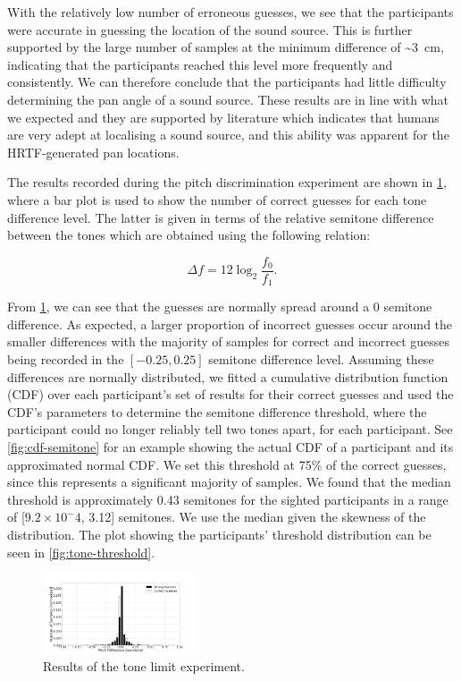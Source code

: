\documentclass[sigconf, review=true, screen=true, anonymous=true]{acmart}
\begin{document}
With the relatively low number of erroneous guesses, we see that the participants were accurate in guessing the location of the sound source.
This is further supported by the large number of samples at the minimum difference of \textasciitilde\SI{3}{\cm}, indicating that the participants reached this level more frequently and consistently.
We can therefore conclude that the participants had little difficulty determining the pan angle of a sound source.
These results are in line with what we expected and they are supported by literature which indicates that humans are very adept at localising a sound source, and this ability was apparent for the HRTF-generated pan locations. 

The results recorded during the pitch discrimination experiment are shown in \cref{fig:tone-guesses}, where a bar plot is used to show the number of correct guesses for each tone difference level.
The latter is given in terms of the relative semitone difference between the tones which are obtained using the following relation: 

\begin{equation}
\label{eq:semitone-difference}
  \Delta f = 12\log_2\frac{f_0}{f_1}.
\end{equation}

From \cref{fig:tone-guesses}, we can see that the guesses are normally spread around a 0 semitone difference.
As expected, a larger proportion of incorrect guesses occur around the smaller differences with the majority of samples for correct and incorrect guesses being recorded in the $[-0.25, 0.25]$ semitone difference level.
Assuming these differences are normally distributed, we fitted a cumulative distribution function (CDF) over each participant's set of results for their correct guesses and used the CDF's parameters to determine the semitone difference threshold, where the participant could no longer reliably tell two tones apart, for each participant.
See \cref{fig:cdf-semitone} for an example showing the actual CDF of a participant and its approximated normal CDF\@.
We set this threshold at 75\% of the correct guesses, since this represents a significant majority of samples.
We found that the median threshold is approximately 0.43 semitones for the sighted participants in a range of [$9.2\times10^-4$, 3.12] semitones.
We use the median given the skewness of the distribution.
The plot showing the participants' threshold distribution can be seen in \cref{fig:tone-threshold}. 

\begin{figure}
  \centering
  \includegraphics[clip, trim=80 0 150 100, width=0.4\textwidth]{figures/tone_guesses.png}
  \caption{Results of the tone limit experiment. }
  \label{fig:tone-guesses}
\end{figure}
\end{document}
